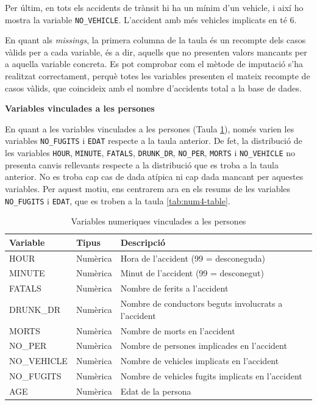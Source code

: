 \documentclass[12pt,longbibliography]{article}
\theoremstyle{definition}
\theoremstyle{remark}
\begin{document}
Per últim, en tots els accidents de trànsit hi ha un mínim d'un vehicle, i així ho mostra la variable \texttt{NO\_VEHICLE}. L'accident amb més vehicles implicats en té 6.


En quant als \emph{missings}, la primera columna de la taula és un recompte dels casos vàlids per a cada variable, és a dir, aquells que no presenten valors mancants per a aquella variable concreta. Es pot comprobar com el mètode de imputació s'ha realitzat correctament, perquè totes les variables presenten el mateix recompte de casos vàlids, que coincideix amb el nombre d'accidents total a la base de dades.

\textbf{Variables vinculades a les persones}

En quant a les variables vinculades a les persones (Taula \ref{tab:num3-table}), només varien les variables \texttt{NO\_FUGITS} i \texttt{EDAT} respecte a la taula anterior. De fet, la distribució de les variables \texttt{HOUR}, \texttt{MINUTE}, \texttt{FATALS}, \texttt{DRUNK\_DR}, \texttt{NO\_PER}, \texttt{MORTS} i \texttt{NO\_VEHICLE} no presenta canvis rellevants respecte a la distribució que es troba a la taula anterior. No es troba cap cas de dada atípica ni cap dada mancant per aquestes variables. Per aquest motiu, ens centrarem ara en els resums de les variables \texttt{NO\_FUGITS} i \texttt{EDAT}, que es troben a la taula \ref{tab:num4-table}.

\begin{table}[H]
\centering
\begin{tabular}{lll}
\hline
Variable    & Tipus    & Descripció                                           \\ \hline
HOUR        & Numèrica & Hora de l’accident (99 = desconeguda)                \\
MINUTE      & Numèrica & Minut de l’accident (99 = desconegut)                \\
FATALS      & Numèrica & Nombre de ferits a l’accident                        \\
DRUNK\_DR   & Numèrica & Nombre de conductors beguts involucrats a l’accident \\
MORTS       & Numèrica & Nombre de morts en l’accident                        \\
NO\_PER     & Numèrica & Nombre de persones implicades en l’accident          \\
NO\_VEHICLE & Numèrica & Nombre de vehicles implicats en l’accident           \\
NO\_FUGITS  & Numèrica & Nombre de vehicles fugits implicats en l’accident    \\
AGE         & Numèrica & Edat de la persona                                   \\ \hline
\end{tabular}
\caption{Variables numeriques vinculades a les persones}
\label{tab:num3-table}
\end{table}
\end{document}

